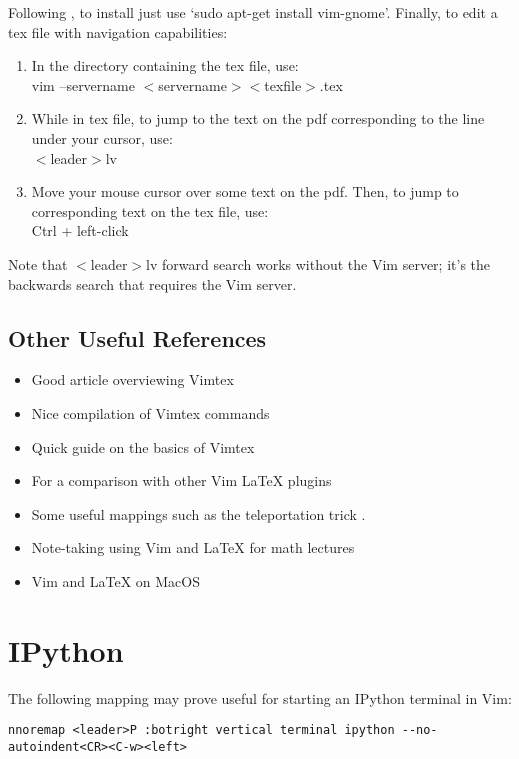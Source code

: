 \documentclass[10pt]{article}
\newcommand{\tlangle}{$<$}
\newcommand{\trangle}{$>$}
\begin{document}
Following \cite{lerner2004enable}, to install just use `sudo apt-get install
vim-gnome'. Finally, to edit a tex file with navigation capabilities:
\begin{enumerate}
    \item In the directory containing the tex file, use:\\
        vim --servername \tlangle servername\trangle \tlangle texfile\trangle.tex
    \item While in tex file, to jump to the text on the pdf corresponding to the
        line under your cursor, use:\\
        \tlangle leader\trangle lv
    \item Move your mouse cursor over some text on the pdf. Then, to jump to
        corresponding text on the tex file, use:\\
        Ctrl + left-click
\end{enumerate}
Note that \tlangle leader\trangle lv forward search works without the Vim
server; it's the backwards search that requires the Vim server.

\subsection{Other Useful References}
\begin{itemize}
    \item Good article overviewing Vimtex \cite{woodruff2019latex}
    \item Nice compilation of Vimtex commands \cite{gunther2014vimtex}
    \item Quick guide on the basics of Vimtex \cite{jdhao2019complete}
    \item For a comparison with other Vim LaTeX plugins \cite{lervag2015vim}
    \item Some useful mappings such as the teleportation trick
        \cite{smith2016my, smith2017start}.
    \item Note-taking using Vim and LaTeX for math lectures \cite{castel2019how}
    \item Vim and LaTeX on MacOS \cite{dyke2020getting}
\end{itemize}

\section{IPython}
The following mapping may prove useful for starting an IPython terminal in
Vim:\\
\begin{lstlisting}
nnoremap <leader>P :botright vertical terminal ipython --no-autoindent<CR><C-w><left>
\end{lstlisting}
\end{document}
